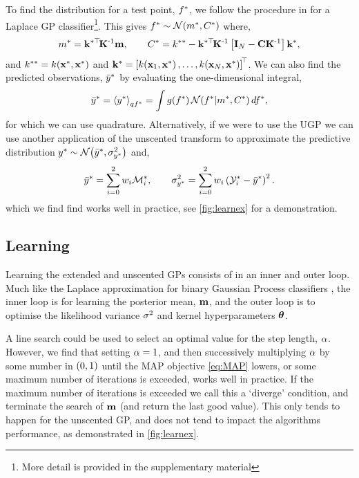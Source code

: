 \documentclass{article} %
\begin{document}
To find the distribution for a test point, $f^{*}$, we follow the
procedure in \cite{Rasmussen2006} for a Laplace GP classifier\footnote{More
    detail is provided in the supplementary material}. This gives
$f^{*} \sim \mathcal{N}\!\left({m^{*}, C^{*}}\right)$ where,
\begin{equation}
    m^{*} = \mathbf{k}^{*\top}\!\mathbf{K}^{\text{-}1}\mathbf{m},
    \qquad
    C^{*} = k^{**} - \mathbf{k}^{*\top}\!\mathbf{K}^{\text{-}1}\left[{\mathbf{I}_{N} -
        \mathbf{C}\mathbf{K}^{\text{-}1}}\right]\mathbf{k}^{*},
\end{equation}
and $k^{**} = k\!\left({\mathbf{x}^{*}, \mathbf{x}^{*}}\right)$ and $\mathbf{k}^{*}
= \left[{k\!\left({\mathbf{x}_1, \mathbf{x}^{*}}\right), \ldots, k\!\left({\mathbf{x}_N,
        \mathbf{x}^{*}}\right)}\right]^{\!\top}$. We can also find the predicted observations,
$\bar{y}^{*}$ by evaluating the one-dimensional integral,
\begin{equation}
    \bar{y}^{*} = \left\langle{\ensuremath{y}\ensuremath{^{*}}}\right\rangle_{qf^{*}} = \int
        g\!\left({{f^{*}}}\right) \mathcal{N}\!\left({f^{*}}\middle\vert{\ensuremath{m}\ensuremath{^{*}},
            \ensuremath{C}\ensuremath{^{*}}}\right) df^{*},
\end{equation}
for which we can use quadrature. Alternatively, if we were to use the UGP we
can use another application of the unscented transform to approximate the
predictive distribution $y^{*} \sim \mathcal{N}\!\left({\bar{y}^{*},
    \sigma^2_{y^{*}}}\right)$ and,
\begin{equation}
    \bar{y}^{*} = \sum^2_{i=0} w_i \mathcal{M}_i^{*}, \qquad 
    \sigma^2_{y^{*}} = \sum^2_{i=0} w_i \left({\mathcal{Y}_i^{*} -
        \bar{y}^{*}}\right)^2.
    \label{eq:slpred}
\end{equation}
which we find find works well in practice, see \autoref{fig:learnex} for a
demonstration.


\subsection{Learning}

Learning the extended and unscented GPs consists of in an inner and outer loop.
Much like the Laplace approximation for binary Gaussian Process classifiers
\cite{Rasmussen2006}, the inner loop is for learning the posterior mean,
$\mathbf{m}$, and the outer loop is to optimise the likelihood variance $\sigma^2$ 
and kernel hyperparameters $\boldsymbol\theta$.

A line search could be used to select an optimal value for the step length,
$\alpha$. However, we find that setting $\alpha=1$, and then successively
multiplying $\alpha$ by some number in $\left({0, 1}\right)$ until the MAP objective
\eqref{eq:MAP} lowers, or some maximum number of iterations is exceeded, works 
well in practice. If the maximum number of iterations is exceeded we call this
a `diverge' condition, and terminate the search of $\mathbf{m}$ (and return the
last good value). This only tends to happen for the unscented GP, and does not
tend to impact the algorithms performance, as demonstrated in 
\autoref{fig:learnex}.
\end{document}
